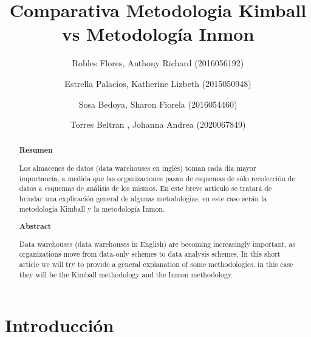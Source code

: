 \documentclass[%
 reprint,
 amsmath,amssymb,
 aps,
]{revtex4-1}
\begin{document}
\title{Comparativa Metodologia Kimball vs Metodología Inmon}
\author{Robles Flores, Anthony Richard	               (2016056192)}
\author{Estrella Palacios, Katherine Lizbeth			(2015050948)}
\author{Sosa Bedoya, Sharon Fiorela					(2016054460)}
\author{Torres Beltran , Johanna Andrea				(2020067849)}

		
%

\begin{abstract}
\begin{center}
\textbf{Resumen}
\end{center}
Los almacenes de datos (data warehouses en inglés) toman cada día mayor importancia, a medida que las organizaciones pasan de esquemas de sólo recolección de datos a esquemas de análisis de los mismos. En este breve artículo se  tratará de brindar una explicación general de algunas metodologías, en este caso serán la metodología Kimball y la metodología Inmon.
\\

\begin{center}
\textbf{Abstract}
\end{center}
Data warehouses (data warehouses in English) are becoming increasingly important, as organizations move from data-only schemes to data analysis schemes. In this short article we will try to provide a general explanation of some methodologies, in this case they will be the Kimball methodology and the Inmon methodology.
\\
\end{abstract}



\maketitle


\section {Introducción}\label{sec:1}
\end{document}

